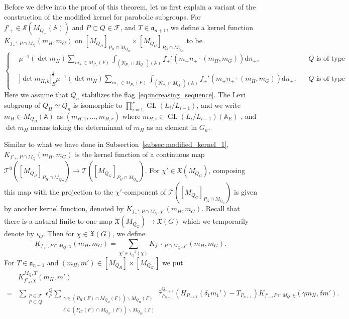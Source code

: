 \documentclass[letterpaper,11pt]{amsart}
\newcommand{\fa}{\mathfrak{a}}
\newcommand{\fX}{\mathfrak{X}}
\newcommand{\bA}{\mathbb{A}}
\newcommand{\cF}{\mathcal{F}}
\newcommand{\cS}{\mathcal{S}}
\newcommand{\cT}{\mathcal{T}}
\newcommand{\rd}{\mathrm{d}}
\newcommand{\<}{\negthickspace}
\DeclareMathOperator{\GL}{GL}
\theoremstyle{definition}
\theoremstyle{plain}
\theoremstyle{remark}
\numberwithin{equation}{section}
\begin{document}
Before we delve into the proof of this theorem, let us first explain a
variant of the construction of the modified kernel for parabolic subgroups.
For $f'_+ \in \cS(M_{Q_+}(\bA))$ and $P \subset Q  \in \cF$,
and $T \in \fa_{n+1}$, we
define a kernel function $K_{f_+',P \cap M_{Q}}(m_H,m_G)$ on
$[M_{Q_H}]_{P_H \cap M_{Q_H}} \times [M_{Q_{G}}]_{P_{G} \cap
M_{Q_{G}}}$ to be
    \[
    \left\{ \begin{aligned}
    &\mu^{-1}(\det m_H)
    \sum_{m_+ \in M_{P_+}(F)} \int_{(N_{P_+} \cap M_{Q_+})(\bA)}
    f_+'(m_+ n_+ \cdot (m_H,m_G)) \rd n_+, &&\text{$Q$ is of type I};\\
    &|\det m_{H,k}|_E^{\frac 12} \mu^{-1}(\det m_H)
    \sum_{m_+ \in M_{P_+}(F)} \int_{(N_{P_+} \cap M_{Q_+})(\bA)}
    f_+'(m_+ n_+ \cdot (m_H,m_G)) \rd n_+, &&\text{$Q$ is of type II}.
    \end{aligned}\right.
    \]
Here we assume that $Q_n$ stabilizes the flag~\eqref{eq:increasing_sequence}. The Levi subgroup of $Q_H \simeq Q_n$ is isomorphic to $\prod_{i = 1}^r \GL(L_i/L_{i-1})$, and we write $m_H\in M_{Q_H}(\bA)$ as $(m_{H, 1}, \hdots, m_{H, r})$ where
$m_{H, i} \in \GL(L_{i}/L_{i-1})(\bA_E)$ , and $\det m_H$ means taking the determinant
of $m_H$ as an element in $G_n$.

Similar to what we have done in Subsection~\ref{subsec:modified_kernel_1},
$K_{f'_+,P \cap M_Q}(m_H,m_G)$ is the kernel function of a continuous map
$\cT^0([M_{Q_H}]_{P_H \cap M_{Q_H}}) \to \cT([M_{Q_G}]_{P_G \cap M_{Q_G}})$.
For $\chi' \in \fX(M_{Q_G})$, composing this map with the projection to the
$\chi'$-component of $\cT([M_{Q_G}]_{P_G \cap M_{Q_G}})$ is given by another
kernel function, denoted by $K_{f_+',P \cap M_Q, \chi'}(m_H,m_G)$. Recall
that there is a natural finite-to-one map $\fX(M_{Q_G}) \to \fX(G)$ which we
temporarily denote by $\iota_Q$. Then for $\chi \in \fX(G)$, we define
    \[
    K_{f_+', P \cap M_Q, \chi}(m_H, m_G) = \sum_{\chi' \in \iota_Q^{-1}(\chi)}
    K_{f_+', P \cap M_Q, \chi'}(m_H, m_G).
    \]
For $T \in \fa_{n+1}$ and $(m_H, m') \in [M_{Q_H}] \times [M_{Q_{G'}}]$ we put
    \begin{align*}
    & K_{f'_+,\chi}^{M_Q,T}(m_H,m') \\
    =& \sum_{\substack{P \in \cF \\ P \subset Q}}
    \epsilon_P^Q \sum_{ \substack{\gamma \in (P_H(F) \cap M_{Q_H}(F))
    \backslash M_{Q_H}(F) \\ \delta \in (P_{G'}(F) \cap M_{Q_{G'}}(F))
    \backslash M_{Q_{G'}}(F)}}
    \widehat{\tau}_{P_{n+1}}^{Q_{n+1}}(H_{P_{n+1}}
    (\delta_1 m_1')-T_{P_{n+1}}) K_{f'_+,P \cap M_Q,\chi}
    (\gamma m_H,\delta m').
    \end{align*}
\end{document}

